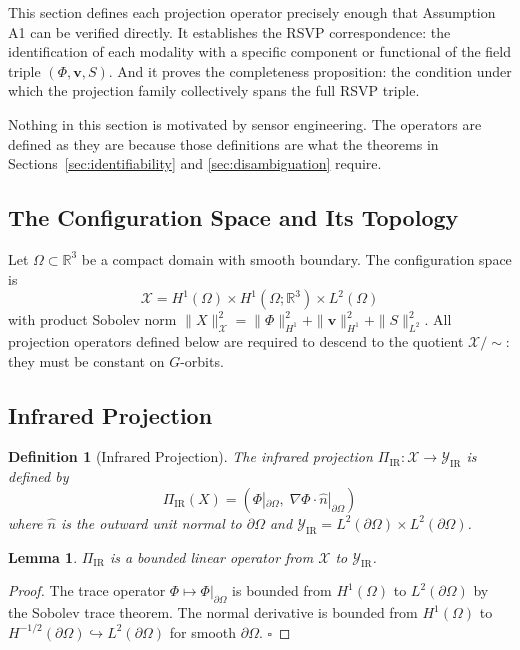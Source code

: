 \documentclass[12pt, oneside]{article}
\newtheorem{lemma}[theorem]{Lemma}
\newtheorem{definition}[theorem]{Definition}
\newcommand{\Xmod}{\mathcal{X}/{\sim}}
\begin{document}
This section defines each projection operator precisely enough that Assumption A1 can be
verified directly. It establishes the RSVP correspondence: the identification of each
modality with a specific component or functional of the field triple $(\Phi, \mathbf{v}, S)$.
And it proves the completeness proposition: the condition under which the projection family
collectively spans the full RSVP triple.

Nothing in this section is motivated by sensor engineering. The operators are defined as
they are because those definitions are what the theorems in Sections~\ref{sec:identifiability}
and \ref{sec:disambiguation} require.

\subsection{The Configuration Space and Its Topology}

Let $\Omega \subset \mathbb{R}^3$ be a compact domain with smooth boundary. The
configuration space is
\[
\mathcal{X} = H^1(\Omega) \times H^1(\Omega; \mathbb{R}^3) \times L^2(\Omega)
\]
with product Sobolev norm $\|X\|_{\mathcal{X}}^2 = \|\Phi\|_{H^1}^2 + \|\mathbf{v}\|_{H^1}^2 + \|S\|_{L^2}^2$.
All projection operators defined below are required to descend to the quotient $\Xmod$:
they must be constant on $G$-orbits.

\subsection{Infrared Projection}

\begin{definition}[Infrared Projection]
The infrared projection $\Pi_{\mathrm{IR}} : \mathcal{X} \to \mathcal{Y}_{\mathrm{IR}}$
is defined by
\[
\Pi_{\mathrm{IR}}(X) = \left( \Phi|_{\partial\Omega},\;
\nabla\Phi \cdot \hat{n}|_{\partial\Omega} \right)
\]
where $\hat{n}$ is the outward unit normal to $\partial\Omega$ and
$\mathcal{Y}_{\mathrm{IR}} = L^2(\partial\Omega) \times L^2(\partial\Omega)$.
\end{definition}

\begin{lemma}
$\Pi_{\mathrm{IR}}$ is a bounded linear operator from $\mathcal{X}$ to $\mathcal{Y}_{\mathrm{IR}}$.
\end{lemma}
\begin{proof}
The trace operator $\Phi \mapsto \Phi|_{\partial\Omega}$ is bounded from $H^1(\Omega)$
to $L^2(\partial\Omega)$ by the Sobolev trace theorem. The normal derivative is bounded
from $H^1(\Omega)$ to $H^{-1/2}(\partial\Omega) \hookrightarrow L^2(\partial\Omega)$ for
smooth $\partial\Omega$. $\square$
\end{proof}
\end{document}
